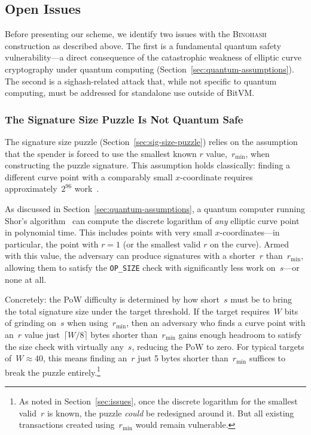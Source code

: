 \documentclass[11pt, a4paper]{article}
\begin{document}
\subsection{Open Issues}
\label{sec:open-issues}

Before presenting our scheme, we identify two issues with the \textsc{Binohash} construction as described above. The first is a fundamental quantum safety vulnerability---a direct consequence of the catastrophic weakness of elliptic curve cryptography under quantum computing (Section~\ref{sec:quantum-assumptions}). The second is a sighash-related attack that, while not specific to quantum computing, must be addressed for standalone use outside of BitVM.

\subsubsection{The Signature Size Puzzle Is Not Quantum Safe}
\label{sec:quantum-vulnerability}

The signature size puzzle (Section~\ref{sec:sig-size-puzzle}) relies on the assumption that the spender is forced to use the smallest known $r$ value,~$r_{\min}$, when constructing the puzzle signature. This assumption holds classically: finding a different curve point with a comparably small $x$-coordinate requires approximately~$2^{96}$ work~\cite[Section~4]{linus2024binohash}.

As discussed in Section~\ref{sec:quantum-assumptions}, a quantum computer running Shor's algorithm~\cite{shor1994} can compute the discrete logarithm of \emph{any} elliptic curve point in polynomial time. This includes points with very small $x$-coordinates---in particular, the point with $r = 1$ (or the smallest valid $r$ on the curve). Armed with this value, the adversary can produce signatures with a shorter~$r$ than~$r_{\min}$, allowing them to satisfy the \texttt{OP\_SIZE} check with significantly less work on~$s$---or none at all.

Concretely: the PoW difficulty is determined by how short~$s$ must be to bring the total signature size under the target threshold. If the target requires~$W$ bits of grinding on~$s$ when using~$r_{\min}$, then an adversary who finds a curve point with an~$r$ value just~$\lceil W/8 \rceil$ bytes shorter than~$r_{\min}$ gains enough headroom to satisfy the size check with virtually any~$s$, reducing the PoW to zero. For typical targets of~$W \approx 40$, this means finding an~$r$ just 5 bytes shorter than~$r_{\min}$ suffices to break the puzzle entirely.\footnote{As noted in Section~\ref{sec:issues}, once the discrete logarithm for the smallest valid~$r$ is known, the puzzle \emph{could} be redesigned around it. But all existing transactions created using~$r_{\min}$ would remain vulnerable.}
\end{document}
